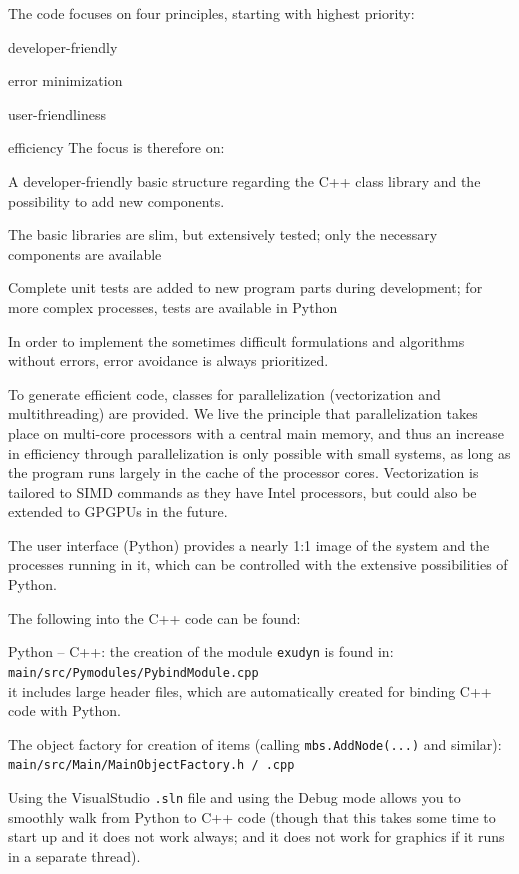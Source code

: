 The code focuses on four principles, starting with highest priority: 
\bn
  \item developer-friendly
  \item error minimization
  \item user-friendliness
  \item efficiency
\en
The focus is therefore on:
\bi
    \item A developer-friendly basic structure regarding the C++ class library and the possibility to add new components.
    \item The basic libraries are slim, but extensively tested; only the necessary components are available
    \item Complete unit tests are added to new program parts during development; for more complex processes, tests are available in Python
    \item In order to implement the sometimes difficult formulations and algorithms without errors, error avoidance is always prioritized.
    \item To generate efficient code, classes for parallelization (vectorization and multithreading) are provided. We live the principle that parallelization takes place on multi-core processors with a central main memory, and thus an increase in efficiency through parallelization is only possible with small systems, as long as the program runs largely in the cache of the processor cores. Vectorization is tailored to SIMD commands as they have Intel processors, but could also be extended to GPGPUs in the future.
    \item The user interface (Python) provides a nearly 1:1 image of the system and the processes running in it, which can be controlled with the extensive possibilities of Python.
\ei

%
The following  into the C++ code can be found:
\bi
  \item Python -- C++: the creation of the module \texttt{exudyn} is found in:\\
  
  \texttt{main/src/Pymodules/PybindModule.cpp}\\
  it includes large header files, which are automatically created for binding C++ code with Python.%
  
  \item The object factory for creation of items (calling \texttt{mbs.AddNode(...)} and similar): \\
    \texttt{main/src/Main/MainObjectFactory.h / .cpp}
  \item Using the VisualStudio \texttt{.sln} file and using the Debug mode allows you to smoothly walk from Python to C++ code (though that this takes some time to start up and it does not work always; and it does not work for graphics if it runs in a separate thread).
\ei

